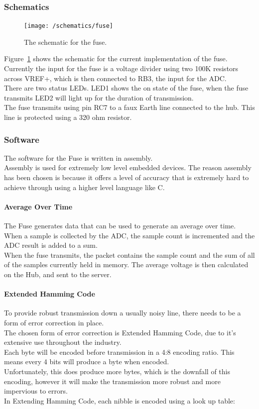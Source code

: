 \documentclass[preprint,12pt,3p]{elsarticle}
\begin{document}
\subsubsection{Schematics}
\begin{figure}[H]
    \centering
    \texttt{[image: /schematics/fuse]}
    \caption{The schematic for the fuse.}
    \label{fig:fuseschematic}
\end{figure}
Figure~\ref{fig:fuseschematic} shows the schematic for the current implementation of the fuse.\\
Currently the input for the fuse is a voltage divider using two 100K resistors across VREF+, which is then connected to RB3, the input for the ADC.\\
There are two status LEDs. LED1 shows the on state of the fuse, when the fuse transmits LED2 will light up for the duration of transmission.\\
The fuse transmits using pin RC7 to a faux Earth line connected to the hub. This line is protected using a 320 ohm resistor.


\subsubsection{Software}
The software for the Fuse is written in assembly.\\
Assembly is used for extremely low level embedded devices. The reason assembly has been chosen is because it offers a level of accuracy that is extremely hard to achieve through using a higher level language like C.\\

\paragraph{Average Over Time}
The Fuse generates data that can be used to generate an average over time.\\
When a sample is collected by the ADC, the sample count is incremented and the ADC result is added to a sum.\\
When the fuse transmits, the packet contains the sample count and the sum of all of the samples currently held in memory. The average voltage is then calculated on the Hub, and sent to the server.

\paragraph{Extended Hamming Code}
To provide robust transmission down a usually noisy line, there needs to be a form of error correction in place.\\
The chosen form of error correction is Extended Hamming Code, due to it's extensive use throughout the industry.\\
Each byte will be encoded before transmission in a 4:8 encoding ratio. This means every 4 bits will produce a byte when encoded.\\
Unfortunately, this does produce more bytes, which is the downfall of this encoding, however it will make the transmission more robust and more impervious to errors.\\
In Extending Hamming Code, each nibble is encoded using a look up table:
\end{document}
